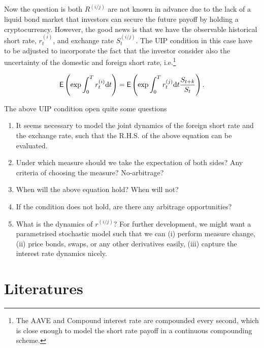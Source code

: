 \documentclass[square]{article} %
\theoremstyle{plain}
\theoremstyle{definition} %
\begin{document}
Now the question is both $R^{(i/j)}$ are not known in advance due to the lack of a liquid bond market that investors can secure the future payoff by holding a cryptocurrency. 
However, the good news is that we have the observable historical short rate, $r_t^{(i)}$, and exchange rate $S_t^{(i/j)}$. 
The UIP condition in this case have to be adjusted to incorporate the fact that the investor consider also the uncertainty of the domestic and foreign short rate, i.e.\footnote{The AAVE and Compound interest rate are compounded every second, which is close enough to model the short rate payoff in a continuous compounding scheme. }

\begin{align*}
  \mathbb{\sf E} \left(\exp{\int_0^T r^{(i)}_t \text{d}t}\right) = \mathbb{\sf E}\left(\exp{\int_0^T r^{(j)}_t\text{d}t}\frac{S_{t+k}}{S_t}\right).
  \end{align*}

The above UIP condition open quite some questions
\begin{enumerate}
  \item It seems necessary to model the joint dynamics of the foreign short rate and the exchange rate, such that the R.H.S. of the above equation can be evaluated.
  \item Under which measure should we take the expectation of both sides? Any criteria of choosing the measure? No-arbitrage? 
  \item When will the above equation hold? When will not?
  \item If the condition does not hold, are there any arbitrage opportunities? 
  \item What is the dynamics of $r^{(i/j)}$? For further development, we might want a parametrised stochastic model such that we can
   (i) perform measure change, (ii) price bonds, swaps, or any other derivatives easily, (iii) capture the interest rate dynamics nicely.
\end{enumerate}

\section{Literatures}
\end{document}
